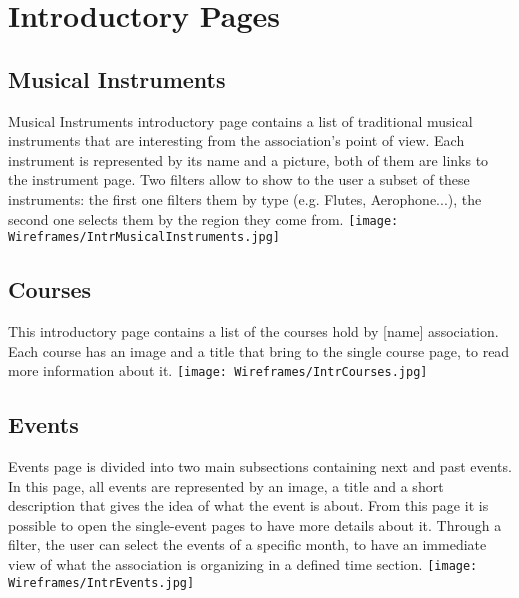\documentclass[../../DD.tex]{subfiles}
\begin{document}
\section{Introductory Pages \label{sect:2.1}}
	\subsection{Musical Instruments}
		Musical Instruments introductory page contains a list of traditional musical instruments that are interesting from the association's point of view. Each instrument is represented by its name and a picture, both of them are links to the instrument page. Two filters allow to show to the user a subset of these instruments: the first one filters them by type (e.g. Flutes, Aerophone...), the second one selects them by the region they come from.
		\newline
		\texttt{[image: Wireframes/IntrMusicalInstruments.jpg]}

	\subsection{Courses}
		This introductory page contains a list of the courses hold by [name] association. Each course has an image and a title that bring to the single course page, to read more information about it.
		\newline
		\texttt{[image: Wireframes/IntrCourses.jpg]}

	\subsection{Events}
		Events page is divided into two main subsections containing next and past events. In this page, all events are represented by an image, a title and a short description that gives the idea of what the event is about. From this page it is possible to open the single-event pages to have more details about it. Through a filter, the user can select the events of a specific month, to have an immediate view of what the association is organizing in a defined time section.
		\newline
		\texttt{[image: Wireframes/IntrEvents.jpg]}
	
\end{document}
